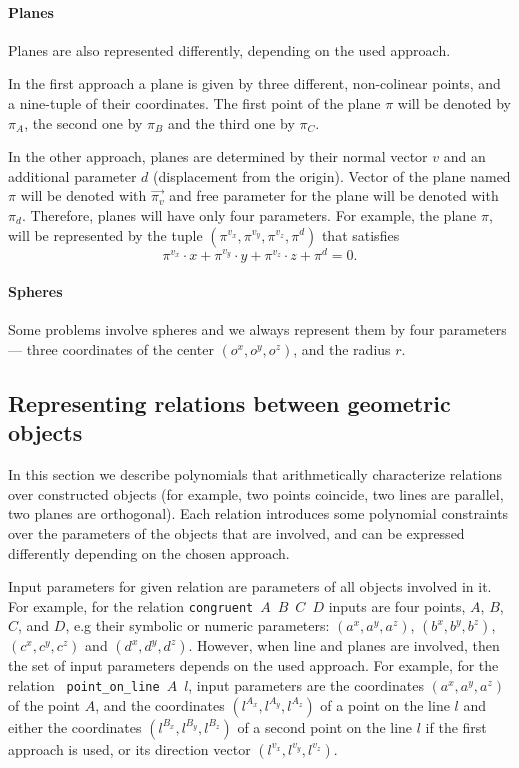 \documentclass[final,1p,times,authoryear]{elsarticle}
\begin{document}
\paragraph{Planes}
Planes are also represented differently, depending on the used
approach.

In the first approach a plane is given by three different,
non-colinear points, and a nine-tuple of their coordinates. The first
point of the plane $\pi$ will be denoted by $\pi_A$, the second one by
$\pi_B$ and the third one by $\pi_C$.

In the other approach, planes are determined by their normal vector
$v$ and an additional parameter $d$ (displacement from the
origin). Vector of the plane named $\pi$ will be denoted with
$\overrightarrow{\pi_v}$ and free parameter for the plane will be
denoted with $\pi_d$. Therefore, planes will have only four
parameters. For example, the plane $\pi$, will be represented by the
tuple $(\pi^{v_x}, \pi^{v_y}, \pi^{v_z}, \pi^{d})$ that satisfies
$$\pi^{v_x}\cdot x + \pi^{v_y}\cdot y + \pi^{v_z}\cdot z + \pi^{d} =
0.$$

\paragraph{Spheres}
Some problems involve spheres and we always represent them by four
parameters --- three coordinates of the center $(o^x, o^y, o^z)$, and
the radius $r$.

\subsection{Representing relations between geometric objects}
In this section we describe polynomials that arithmetically
characterize relations over constructed objects (for example, two
points coincide, two lines are parallel, two planes are
orthogonal). Each relation introduces some polynomial constraints over
the parameters of the objects that are involved, and can be expressed
differently depending on the chosen approach.

Input parameters for given relation are parameters of all objects
involved in it. For example, for the relation \mbox{{\tt congruent}
  $A$ $B$ $C$ $D$} inputs are four points, $A$, $B$, $C$, and $D$, e.g
their symbolic or numeric parameters: $(a^x, a^y, a^z)$,
$(b^x, b^y, b^z)$, $(c^x, c^y, c^z)$ and $(d^x, d^y, d^z)$. However,
when line and planes are involved, then the set of input parameters
depends on the used approach. For example, for the relation \mbox{{\tt
    point\_on\_line} $A$ $l$}, input parameters are the coordinates
$(a^x, a^y, a^z)$ of the point $A$, and the coordinates
$(l^{A_x}, l^{A_y}, l^{A_z})$ of a point on the line $l$ and either the
coordinates $(l^{B_x}, l^{B_y}, l^{B_z})$ of a second point on the line $l$
if the first approach is used, or its direction vector
$(l^{v_x}, l^{v_y}, l^{v_z})$.
\end{document}
